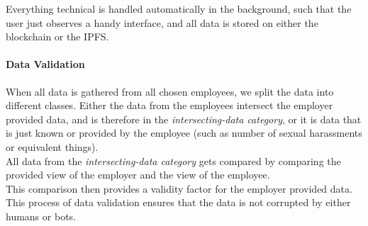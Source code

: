 Everything technical is handled automatically in the background, such that the user just observes a handy interface, and all data is stored on either the blockchain or the IPFS.

\paragraph*{Data Validation}
When all data is gathered from all chosen employees, we split the data into different classes. Either the data from the employees intersect the employer provided data, and is therefore in the \textit{intersecting-data category}, or it is data that is just known or provided by the employee (such as number of sexual harassments or equivalent things).\\

All data from the \textit{intersecting-data category} gets compared by comparing the provided view of the employer and the view of the employee.\\
This comparison then provides a validity factor for the employer provided data.\\

This process of data validation ensures that the data is not corrupted by either humans or bots.\\


